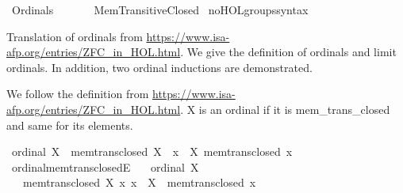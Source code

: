%
\begin{isabellebody}%
%
%
\isadelimdocument
%
\endisadelimdocument
%
\isatagdocument
\isanewline
%
\isamarkuptrue%
%
\endisatagdocument
{\isafolddocument}%
%
\isadelimdocument
%
\endisadelimdocument
%
\isadelimtheory
%
\endisadelimtheory
%
\isatagtheory
{}\isamarkupfalse%
\ Ordinals\isanewline
\ \ \isanewline
\ \ \ \ Mem{\isacharunderscore}{\kern0pt}Transitive{\isacharunderscore}{\kern0pt}Closed\isanewline
{}%
\endisatagtheory
{\isafoldtheory}%
%
\isadelimtheory
\isanewline
%
\endisadelimtheory
\isanewline
{}\isamarkupfalse%
\ no{\isacharunderscore}{\kern0pt}HOL{\isacharunderscore}{\kern0pt}groups{\isacharunderscore}{\kern0pt}syntax%
\isadelimdocument
%
\endisadelimdocument
%
\isatagdocument
%
\isamarkuptrue%
%
\endisatagdocument
{\isafolddocument}%
%
\isadelimdocument
%
\endisadelimdocument
%
\begin{isamarkuptext}%
Translation of ordinals from \url{https://www.isa-afp.org/entries/ZFC_in_HOL.html}.
We give the definition of ordinals and limit ordinals. In addition,
two ordinal inductions are demonstrated.%
\end{isamarkuptext}\isamarkuptrue%
%
\isadelimdocument
%
\endisadelimdocument
%
\isatagdocument
%
\isamarkuptrue%
%
\endisatagdocument
{\isafolddocument}%
%
\isadelimdocument
%
\endisadelimdocument
%
\begin{isamarkuptext}%
We follow the definition from \url{https://www.isa-afp.org/entries/ZFC_in_HOL.html}.
X is an ordinal if it is mem\_trans\_closed and same for its elements.%
\end{isamarkuptext}\isamarkuptrue%
\isamarkupfalse%
\ {\isachardoublequoteopen}ordinal\ X\ {\isasymequiv}\ mem{\isacharunderscore}{\kern0pt}trans{\isacharunderscore}{\kern0pt}closed\ X\ {\isasymand}\ {\isacharparenleft}{\kern0pt}{\isasymforall}x\ {\isasymin}\ X{\isachardot}{\kern0pt}\ mem{\isacharunderscore}{\kern0pt}trans{\isacharunderscore}{\kern0pt}closed\ x{\isacharparenright}{\kern0pt}{\isachardoublequoteclose}\isanewline
\isanewline
{}\isamarkupfalse%
\ ordinal{\isacharunderscore}{\kern0pt}mem{\isacharunderscore}{\kern0pt}trans{\isacharunderscore}{\kern0pt}closedE{\isacharcolon}{\kern0pt}\isanewline
\ \ \ {\isachardoublequoteopen}ordinal\ X{\isachardoublequoteclose}\isanewline
\ \ \ {\isachardoublequoteopen}mem{\isacharunderscore}{\kern0pt}trans{\isacharunderscore}{\kern0pt}closed\ X{\isachardoublequoteclose}\ {\isachardoublequoteopen}{\isasymAnd}x{\isachardot}{\kern0pt}\ x\ {\isasymin}\ X\ {\isasymLongrightarrow}\ mem{\isacharunderscore}{\kern0pt}trans{\isacharunderscore}{\kern0pt}closed\ x{\isachardoublequoteclose}\isanewline

\end{isabellebody}

